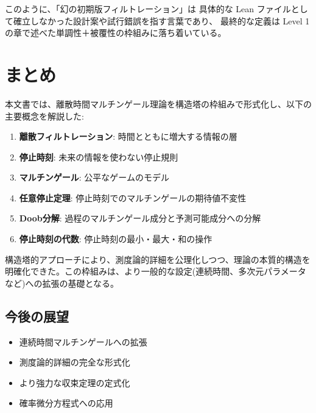 \documentclass[a4paper,12pt]{ltjsarticle}
\theoremstyle{definition}
\begin{document}
このように、「幻の初期版フィルトレーション」は
具体的な Lean ファイルとして確立しなかった設計案や試行錯誤を指す言葉であり、
最終的な定義は Level 1 の章で述べた単調性＋被覆性の枠組みに落ち着いている。

\section{まとめ}

本文書では、離散時間マルチンゲール理論を構造塔の枠組みで形式化し、以下の主要概念を解説した:

\begin{enumerate}
  \item \textbf{離散フィルトレーション}: 時間とともに増大する情報の層
  \item \textbf{停止時刻}: 未来の情報を使わない停止規則
  \item \textbf{マルチンゲール}: 公平なゲームのモデル
  \item \textbf{任意停止定理}: 停止時刻でのマルチンゲールの期待値不変性
  \item \textbf{Doob分解}: 過程のマルチンゲール成分と予測可能成分への分解
  \item \textbf{停止時刻の代数}: 停止時刻の最小・最大・和の操作
\end{enumerate}

構造塔的アプローチにより、測度論的詳細を公理化しつつ、理論の本質的構造を明確化できた。この枠組みは、より一般的な設定(連続時間、多次元パラメータなど)への拡張の基礎となる。

\subsection{今後の展望}

\begin{itemize}
  \item 連続時間マルチンゲールへの拡張
  \item 測度論的詳細の完全な形式化
  \item より強力な収束定理の定式化
  \item 確率微分方程式への応用
\end{itemize}
\end{document}
